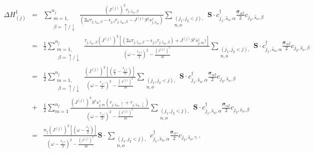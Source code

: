\documentclass[aps,prb,preprint,groupedaddress]{revtex4-2}
\begin{document}
\begin{eqnarray}
\Delta H^{1}_{(j)}&=&\sum_{\substack{m=1,\\ \beta=\uparrow/\downarrow}}^{n_{j}}\frac{(J^{(j)})^{2}\tau_{j,\hat{s}_{m},\beta}}{(2\omega\tau_{j,\hat{s}_{m},\beta} - \epsilon_{j,l}\tau_{j,\hat{s}_{m},\beta}-J^{(j)}S^{z}s^{z}_{j,\hat{s}_{m}})}\sum_{\substack{(j_{1},j_{2}<j),\\ n,o}}\mathbf{S}\cdot c^{\dagger}_{j_{1},\hat{s}_{n},\alpha}\frac{\boldsymbol{\sigma}_{\alpha\beta}}{2}c_{j_{2},\hat{s}_{o},\beta}\nonumber\\
&=&\frac{1}{2}\sum_{\substack{m=1,\\~\beta=\uparrow/\downarrow}}^{n_{j}}\frac{\tau_{j,\hat{s}_{m},\beta}(J^{(j)})^{2}\left[(2\omega\tau_{j,\hat{s}_{m},\beta}-\epsilon_{j,l}\tau_{j,\hat{s}_{m},\beta})+J^{(j)}S^{z}s^{z}_{j,m})\right]}{(\omega - \frac{\epsilon_{j,l}}{2})^{2}-\frac{\left(J^{(j)}\right)^{2}}{16}}\sum_{\substack{(j_{1},j_{2}<j),\\ n,o}}\mathbf{S}\cdot c^{\dagger}_{j_{1},\hat{s}_{n},\alpha}\frac{\boldsymbol{\sigma}_{\alpha\beta}}{2}c_{j_{2},\hat{s}_{o},\beta}\nonumber\\
&=&\frac{1}{2}\sum_{\substack{m=1,\\~\beta=\uparrow/\downarrow}}^{n_{j}}\frac{(J^{(j)})^{2}\left[(\frac{\omega}{2}-\frac{\epsilon_{j,l}}{4})\right]}{(\omega - \frac{\epsilon_{j,l}}{2})^{2}-\frac{\left(J^{(j)}\right)^{2}}{16}}\sum_{\substack{(j_{1},j_{2}<j),\\ n,o}}\mathbf{S}\cdot c^{\dagger}_{j_{1},\hat{s}_{n},\alpha}\frac{\boldsymbol{\sigma}_{\alpha\beta}}{2}c_{j_{2},\hat{s}_{o},\beta}\nonumber\\
&+&\frac{1}{2}\sum_{m=1}^{n_{j}}\frac{(J^{(j)})^{3}S^{z}s^{z}_{j,m}(\tau_{j,\hat{s}_{m},\uparrow}+\tau_{j,\hat{s}_{m},\downarrow})}{(\omega - \frac{\epsilon_{j,l}}{2})^{2}-\frac{\left(J^{(j)}\right)^{2}}{16}}\sum_{\substack{(j_{1},j_{2}<j),\\ n,o}}\mathbf{S}\cdot c^{\dagger}_{j_{1},\hat{s}_{n},\alpha}\frac{\boldsymbol{\sigma}_{\alpha\beta}}{2}c_{j_{2},\hat{s}_{o},\beta}\label{intermediate_step}\\
&=&\frac{n_{j}(J^{(j)})^{2}\left[(\omega - \frac{\epsilon_{j}}{2})\right]}{(\omega - \frac{\epsilon_{j,l}}{2})^{2}-\frac{\left(J^{(j)}\right)^{2}}{16}}\mathbf{S}\cdot \sum_{\substack{(j_{1},j_{2}<j),\\ n,o}} c^{\dagger}_{j_{1},\hat{s}_{n},\alpha}\frac{\boldsymbol{\sigma}_{\alpha\gamma}}{2}c_{j_{2},\hat{s}_{o},\gamma}~.\label{hamrg}
\end{eqnarray}
\end{document}
